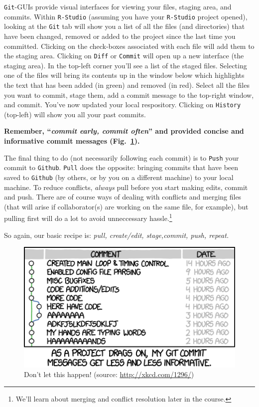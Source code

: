 \documentclass[12pt,letterpaper]{article}
\begin{document}
\texttt{Git}-GUIs provide visual interfaces for viewing your files, staging area, and commits.
Within \texttt{R-Studio} (assuming you have your \texttt{R-Studio} project opened), looking at the \texttt{Git} tab will show you a list of all the files (and directories) that have been changed, removed or added to the project since the last time you committed.
Clicking on the check-boxes associated with each file will add them to the staging area.
Clicking on \texttt{Diff} or \texttt{Commit} will open up a new interface (the staging area).
In the top-left corner you'll see a list of the staged files.
Selecting one of the files will bring its contents up in the window below which highlights the text that has been added (in green) and removed (in red).
Select all the files you want to commit, stage them, add a commit message to the top-right window, and commit.
You've now updated your local respository.
Clicking on \texttt{History} (top-left) will show you all your past commits.

\textbf{Remember, ``\emph{commit early, commit often}'' and provided concise and informative commit messages (Fig.~\ref{fig:commit_messages}).}

The final thing to do (not necessarily following each commit) is to \texttt{Push} your commit to \texttt{Github}.
\texttt{Pull} does the opposite: bringing commits that have been saved to \texttt{Github} (by others, or by you on a different machine) to your local machine.
To reduce conflicts, \emph{always} pull before you start making edits, commit and push.
There are of course ways of dealing with conflicts and merging files (that will arise if collaborator(s) are working on the same file, for example), but pulling first will do a lot to avoid unneccessary hassle.\footnote{We'll learn about merging and conflict resolution later in the course.}

So again, our basic recipe is:
\emph{pull, create/edit, stage,commit, push, repeat.}

\begin{figure}[!h]
	\centering
	\includegraphics[width=0.7\linewidth]{figs/xkcd_git_commit}
	\caption{Don't let this happen!  (source: \url{http://xkcd.com/1296/})}
	\label{fig:commit_messages}
\end{figure}




\end{document}

